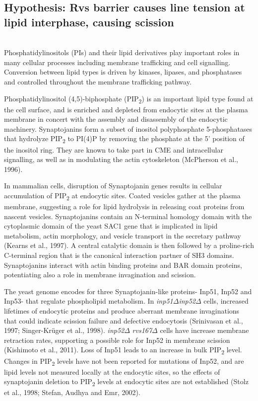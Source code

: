\subsection{Hypothesis: Rvs barrier causes line tension at lipid interphase, causing scission}
			\mbox{}\\
Phosphatidylinositols (PIs) and their lipid derivatives play important roles in many cellular processes including membrane trafficking and cell signalling. Conversion between lipid types is driven by kinases, lipases, and phosphatases and controlled throughout the membrane trafficking pathway. 


\vspace{5mm}
Phosphatidylinositol (4,5)-biphosphate (PIP\textsubscript{2}) is an important lipid type found at the cell surface, and is enriched and depleted from endocytic sites at the plasma membrane in concert with the assembly and disassembly of the endocytic machinery. Synaptojanins form a subset of inositol polyphosphate 5-phosphatases that hydrolyze PIP\textsubscript{2} to PI(4)P by removing the phosphate at the 5’ position of the inositol ring. They are known to take part in CME and intracellular signalling, as well as in modulating the actin cytoskeleton (McPherson et al., 1996). 


\vspace{5mm}
In mammalian cells, disruption of Synaptojanin genes results in cellular accumulation of PIP\textsubscript{2} at endocytic sites. Coated vesicles gather at the plasma membrane, suggesting a role for lipid hydrolysis in releasing coat proteins from nascent vesicles. Synaptojanins contain an N-terminal homology domain with the cytoplasmic domain of the yeast SAC1 gene that is implicated in lipid metabolism, actin morphology, and vesicle transport in the secretary pathway (Kearns et al., 1997). A central catalytic domain is then followed by a proline-rich C-terminal region that is the canonical interaction partner of SH3 domains. Synaptojanins interact with actin binding proteins and BAR domain proteins, potentiating also a role in membrane invagination and scission. 


\vspace{5mm}
The yeast genome encodes for three Synaptojanin-like proteins- Inp51, Inp52 and Inp53- that regulate phospholipid metabolism. In \textit{inp51$\Delta$}\textit{inp52$\Delta$}
 cells, increased lifetimes of endocytic proteins and produce aberrant membrane invaginations that could indicate scission failure and defective endocytosis (Srinivasan et al., 1997; Singer-Krüger et al., 1998). \textit{inp52$\Delta$} \textit{rvs167$\Delta$}
 cells have increase membrane retraction rates, supporting a possible role for Inp52 in membrane scission (Kishimoto et al., 2011). Loss of Inp51 leads to an increase in bulk PIP\textsubscript{2} level. Changes in PIP\textsubscript{2} levels have not been reported for mutations of Inp52, and are lipid levels not measured locally at the endocytic sites, so the effects of synaptojanin deletion to PIP\textsubscript{2} levels at endocytic sites are not established (Stolz et al., 1998; Stefan, Audhya and Emr, 2002).



